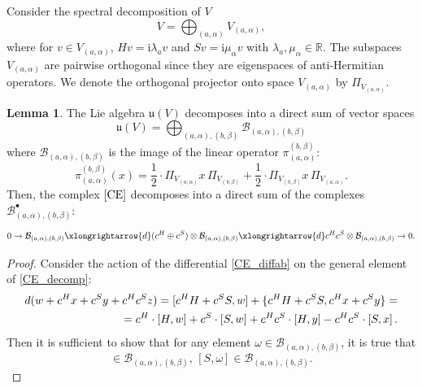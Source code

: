 \documentclass[10pt,a4paper]{amsart}
\theoremstyle{definition}
\newtheorem{lemma}[remark]{Lemma}
\begin{document}
Consider the spectral decomposition of $V$
\begin{equation}
    V=\bigoplus_{(a,\alpha)}V_{(a,\alpha)},
\end{equation}
 where for $v\in V_{(a,\alpha)}$, $Hv=\mathrm{i}\lambda_a v$ and $Sv=\mathrm{i}\mu_\alpha v$ with $\lambda_a,\mu_\alpha\in \mathbb{R}$. The subspaces $V_{(a,\alpha)}$ are pairwise orthogonal since they are eigenspaces of anti-Hermitian operators. We denote the orthogonal projector onto space $V_{(a,\alpha)}$ by $\Pi_{V_{(a,\alpha)}}$.
\begin{lemma} \label{lemma:decomposition}
    The Lie algebra $\mathfrak{u}(V)$ decomposes into a direct sum of vector spaces
    \begin{equation}
    \label{grading}
        \mathfrak{u}(V)=\bigoplus_{(a,\alpha),(b,\beta)}\mathcal{B}_{(a,\alpha),(b,\beta)}
    \end{equation}
    where $\mathcal{B}_{(a,\alpha),(b,\beta)}$ is the image of the linear operator $\pi_{(a,\alpha)}^{(b,\beta)}$:
    \begin{equation}
        \pi_{(a,\alpha)}^{(b,\beta)}(x)=\frac{1}{2}\cdot \Pi_{V_{(a,\alpha)}}x\,\Pi_{V_{(b,\beta)}}+\frac{1}{2}\cdot \Pi_{V_{(b,\beta)}}x\,\Pi_{V_{(a,\alpha)}}.
    \end{equation}
    Then, the complex $\eqref{CE}$ decomposes into a direct sum of the complexes $\mathcal{B}_{(a,\alpha),(b,\beta)}^{\bullet}$:
    \begin{equation}
    \label{CE_decomp}
        0\rightarrow \mathcal{B}_{(a,\alpha),(b,\beta)}\xlongrightarrow{d}(c^H\oplus c^S)\otimes \mathcal{B}_{(a,\alpha),(b,\beta)} \xlongrightarrow{d} c^H c^S\otimes \mathcal{B}_{(a,\alpha),(b,\beta)}\rightarrow 0.
    \end{equation}
    \begin{proof}
    Consider the action of the differential \eqref{CE_diffab} on the general element of \eqref{CE_decomp}:
        \begin{eqnarray}
            \notag d(w+c^{H}x+c^{S}y+c^{H}c^{S}z)=[c^H H+c^S S, w]+\{c^H H+c^S S,c^{H}x+c^{S}y\}=\\=c^{H}\cdot [H,w]+c^{S}\cdot [S,w]+c^{H}c^{S}\cdot[H,y]-c^{H}c^{S}\cdot[S,x]\,.
        \end{eqnarray}
    Then it is sufficient to show that for any element $\omega\in\mathcal{B}_{(a,\alpha),(b,\beta)}$, it is true that 
        \begin{equation}
            [H,\omega]\in\mathcal{B}_{(a,\alpha),(b,\beta)},\, [S,\omega]\in\mathcal{B}_{(a,\alpha),(b,\beta)}.

\end{equation}
\end{proof}
\end{lemma}
\end{document}
